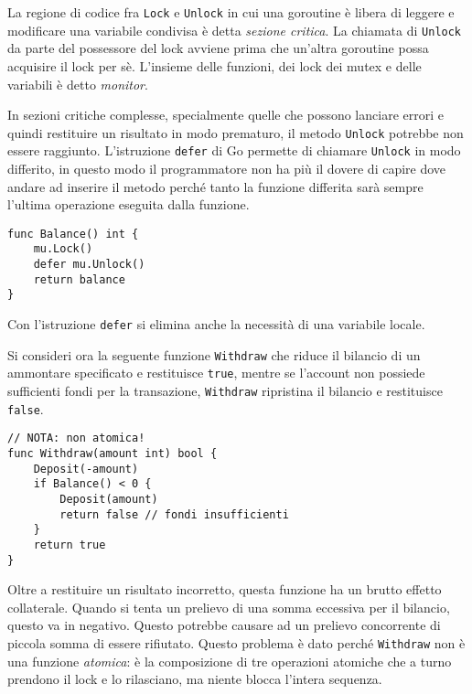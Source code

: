 \documentclass[../../thesis.tex]{subfiles}
\begin{document}
    La regione di codice fra \verb"Lock" e \verb"Unlock" in cui una goroutine è libera di leggere e modificare una variabile condivisa è detta \textit{sezione critica}.
    La chiamata di \verb"Unlock" da parte del possessore del lock avviene prima che un'altra goroutine possa acquisire il lock per sè.
    L'insieme delle funzioni, dei lock dei mutex e delle variabili è detto \textit{monitor}.
    \hfill \vspace{12pt}

    In sezioni critiche complesse, specialmente quelle che possono lanciare errori e quindi restituire un risultato in modo prematuro, il metodo \verb"Unlock" potrebbe non essere raggiunto.
    L'istruzione \verb"defer" di Go permette di chiamare \verb"Unlock" in modo differito, in questo modo il programmatore non ha più il dovere di capire dove andare ad inserire il metodo perché tanto la funzione differita sarà sempre l'ultima operazione eseguita dalla funzione.
    \clearpage
    \newpage
    \begin{lstlisting}[frame = single, label = {lst:lstlisting9-2.4}]
func Balance() int {
    mu.Lock()
    defer mu.Unlock()
    return balance
}
    \end{lstlisting}
    Con l'istruzione \verb"defer" si elimina anche la necessità di una variabile locale.
    \hfill \vspace{12pt}

    Si consideri ora la seguente funzione \verb"Withdraw" che riduce il bilancio di un ammontare specificato e restituisce \verb"true", mentre se l'account non possiede sufficienti fondi per la transazione, \verb"Withdraw" ripristina il bilancio e restituisce \verb"false".
    \begin{lstlisting}[frame = single, label = {lst:lstlisting9-2.5}]
// NOTA: non atomica!
func Withdraw(amount int) bool {
    Deposit(-amount)
    if Balance() < 0 {
        Deposit(amount)
        return false // fondi insufficienti
    }
    return true
}
    \end{lstlisting}
    Oltre a restituire un risultato incorretto, questa funzione ha un brutto effetto collaterale.
    Quando si tenta un prelievo di una somma eccessiva per il bilancio, questo va in negativo.
    Questo potrebbe causare ad un prelievo concorrente di piccola somma di essere rifiutato.
    Questo problema è dato perché \verb"Withdraw" non è una funzione \textit{atomica}: è la composizione di tre operazioni atomiche che a turno prendono il lock e lo rilasciano, ma niente blocca l'intera sequenza.
    \hfill \vspace{12pt}
\end{document}
